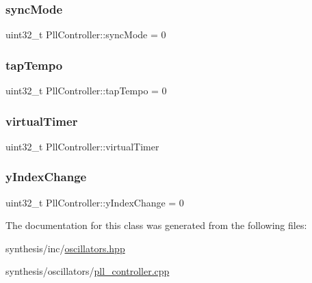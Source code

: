 \mbox{\label{class_pll_controller_a70195365dbe2fdef1da3f5be902a1659}} 
\subsubsection{\texorpdfstring{sync\+Mode}{syncMode}}
{\footnotesize\ttfamily uint32\+\_\+t Pll\+Controller\+::sync\+Mode = 0}

\mbox{\label{class_pll_controller_a5b7d79e70308866985115d8ed8d8f6b7}} 
\subsubsection{\texorpdfstring{tap\+Tempo}{tapTempo}}
{\footnotesize\ttfamily uint32\+\_\+t Pll\+Controller\+::tap\+Tempo = 0}

\mbox{\label{class_pll_controller_a89e3f6e5735bac7bd9f439d64fa471a1}} 
\subsubsection{\texorpdfstring{virtual\+Timer}{virtualTimer}}
{\footnotesize\ttfamily uint32\+\_\+t Pll\+Controller\+::virtual\+Timer}

\mbox{\label{class_pll_controller_ad89f1e970fa2b2cc2da56fc83a189be7}} 
\subsubsection{\texorpdfstring{y\+Index\+Change}{yIndexChange}}
{\footnotesize\ttfamily uint32\+\_\+t Pll\+Controller\+::y\+Index\+Change = 0}



The documentation for this class was generated from the following files\+:\begin{DoxyCompactItemize}
\item 
synthesis/inc/\mbox{\hyperlink{oscillators_8hpp}{oscillators.\+hpp}}\item 
synthesis/oscillators/\mbox{\hyperlink{pll__controller_8cpp}{pll\+\_\+controller.\+cpp}}\end{DoxyCompactItemize}
